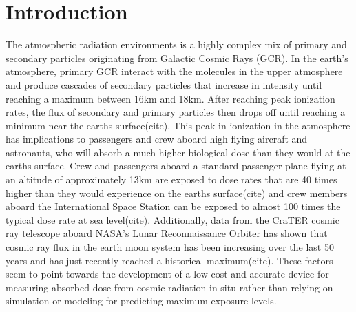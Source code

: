 \section{Introduction}
\label{Introduction}
The atmospheric radiation environments is a highly complex mix of primary and secondary particles originating from Galactic Cosmic Rays (GCR). In the earth’s atmosphere, primary GCR interact with the molecules in the upper atmosphere and produce cascades of secondary particles that increase in intensity until reaching a maximum between 16km and 18km. After reaching peak ionization rates, the flux of secondary and primary particles then drops off until reaching a minimum near the earths surface(cite). This peak in ionization in the atmosphere has implications to passengers and crew aboard high flying aircraft and astronauts, who will absorb a much higher biological dose than they would at the earths surface.  Crew and passengers aboard a standard passenger plane flying at an altitude of approximately 13km are exposed to dose rates that are 40 times higher than they would experience on the earths surface(cite) and crew members aboard the International Space Station can be exposed to almost 100 times the typical dose rate at sea level(cite). Additionally, data from the CraTER cosmic ray telescope aboard NASA’s Lunar Reconnaissance Orbiter has shown that cosmic ray flux in the earth moon system has been increasing over the last 50 years and has just recently reached a historical maximum(cite). These factors seem to point towards the development of a low cost  and accurate device for measuring absorbed dose from cosmic radiation in-situ rather than relying on simulation or modeling for predicting maximum exposure levels. 

